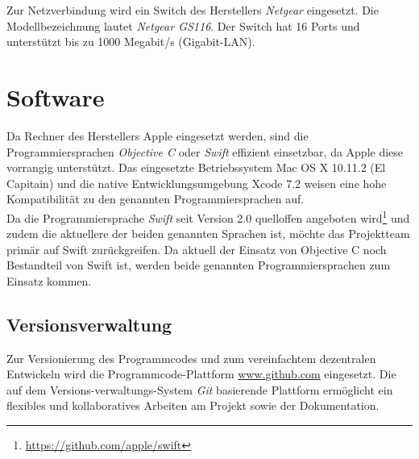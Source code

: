Zur Netzverbindung wird ein Switch des Herstellers \emph{Netgear} eingesetzt. Die Modellbezeichnung lautet \emph{Netgear GS116}. Der Switch hat 16 Ports und unterstützt bis zu 1000 Megabit/s (Gigabit-LAN).

\section{Software}
\label{softwarebasis}
Da Rechner des Herstellers Apple eingesetzt werden, sind die Programmiersprachen \emph{Objective C} oder \emph{Swift} effizient einsetzbar, da Apple diese vorrangig unterstützt. Das eingesetzte Betriebssystem Mac OS X 10.11.2 (El Capitain) und die native Entwicklungsumgebung Xcode 7.2 weisen eine hohe Kompatibilität zu den genannten Programmiersprachen auf. \\
Da die Programmiersprache \emph{Swift} seit Version 2.0 quelloffen angeboten wird\footnote{\url{https://github.com/apple/swift}} und zudem die aktuellere der beiden genannten Sprachen ist, möchte das Projektteam primär auf Swift zurückgreifen. Da aktuell der Einsatz von Objective C noch Bestandteil von Swift ist, werden beide genannten Programmiersprachen zum Einsatz kommen. \\
\subsection{Versionsverwaltung}
Zur Versionierung des Programmcodes und zum vereinfachtem dezentralen Entwickeln wird die Programmcode-Plattform \url{www.github.com} eingesetzt. Die auf dem Versions-verwaltungs-System \emph{Git} basierende Plattform ermöglicht ein flexibles und kollaboratives Arbeiten am Projekt sowie der Dokumentation. \\
